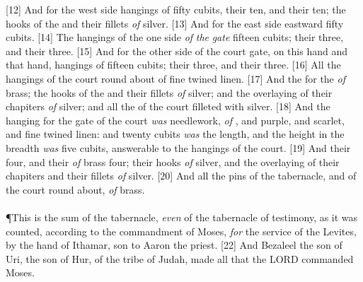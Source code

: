 [12] \textcolor[cmyk]{0.99998,1,0,0}{And for the west side  hangings of fifty cubits, their  ten, and their  ten; the hooks of the  and their fillets \emph{of} silver.}
[13] \textcolor[cmyk]{0.99998,1,0,0}{And for the east side eastward fifty cubits.}
[14] \textcolor[cmyk]{0.99998,1,0,0}{The hangings of the one side \emph{of} \emph{the} \emph{gate}  fifteen cubits; their  three, and their  three.}
[15] \textcolor[cmyk]{0.99998,1,0,0}{And for the other side of the court gate, on this hand and that hand,  hangings of fifteen cubits; their  three, and their  three.}
[16] \textcolor[cmyk]{0.99998,1,0,0}{All the hangings of the court round about  of fine twined linen.}
[17] \textcolor[cmyk]{0.99998,1,0,0}{And the  for the   \emph{of} brass; the hooks of the  and their fillets \emph{of} silver; and the overlaying of their chapiters \emph{of} silver; and all the  of the court  filleted with silver.}
[18] \textcolor[cmyk]{0.99998,1,0,0}{And the hanging for the gate of the court \emph{was} needlework, \emph{of} , and purple, and scarlet, and fine twined linen: and twenty cubits \emph{was} the length, and the height in the breadth \emph{was} five cubits, answerable to the hangings of the court.}
[19] \textcolor[cmyk]{0.99998,1,0,0}{And their   four, and their  \emph{of} brass four; their hooks \emph{of} silver, and the overlaying of their chapiters and their fillets \emph{of} silver.}
[20] \textcolor[cmyk]{0.99998,1,0,0}{And all the pins of the tabernacle, and of the court round about,  \emph{of} brass.}\\
\\
\P \textcolor[cmyk]{0.99998,1,0,0}{This is the sum of the tabernacle, \emph{even} of the tabernacle of testimony, as it was counted, according to the commandment of Moses, \emph{for} the service of the Levites, by the hand of Ithamar, son to Aaron the priest.}
[22] \textcolor[cmyk]{0.99998,1,0,0}{And Bezaleel the son of Uri, the son of Hur, of the tribe of Judah, made all that the LORD commanded Moses.}
